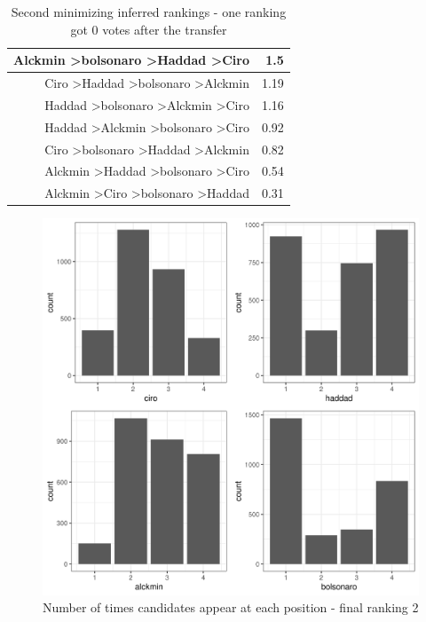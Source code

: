 \documentclass[hidelinks,11pt]{article}
\begin{document}
\begin{table}[H]
\begin{tabular}{|r|r|}
Alckmin \textgreater bolsonaro \textgreater Haddad \textgreater Ciro & 1.5                                  \\ \hline
Ciro \textgreater Haddad \textgreater bolsonaro \textgreater Alckmin & 1.19                                 \\ \hline
Haddad \textgreater bolsonaro \textgreater Alckmin \textgreater Ciro & 1.16                                 \\ \hline
Haddad \textgreater Alckmin \textgreater bolsonaro \textgreater Ciro & 0.92                                 \\ \hline
Ciro \textgreater bolsonaro \textgreater Haddad \textgreater Alckmin & 0.82                                 \\ \hline
Alckmin \textgreater Haddad \textgreater bolsonaro \textgreater Ciro & 0.54                                 \\ \hline
Alckmin \textgreater Ciro \textgreater bolsonaro \textgreater Haddad & 0.31                                 \\ \hline
\end{tabular}
\caption{Second minimizing inferred rankings - one ranking got 0 votes after the transfer}
\end{table}



\begin{figure}[H]
 \centering
 \includegraphics[width=0.8\columnwidth,
 height=0.5\textheight]{./images/corrected2_indexes_plot.png}
 \caption{Number of times candidates appear at each position - final ranking 2}
\end{figure}
\end{document}
